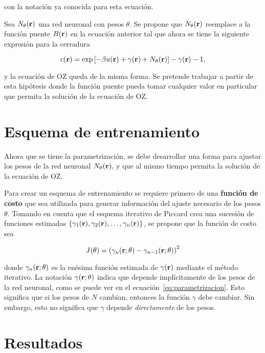 con la notación ya conocida para esta ecuación.

Sea $N_{\theta}(\mathbf{r})$ una red neuronal con pesos $\theta$. Se propone que
$N_{\theta}(\mathbf{r})$ reemplace a la función puente $B(\mathbf{r})$ en la ecuación
anterior tal que ahora se tiene la siguiente expresión para la cerradura

\begin{equation}
    c(\mathbf{r}) = \exp{\left[
            -  \beta u(\mathbf{r})
            +  \gamma(\mathbf{r})
            + N_{\theta}(\mathbf{r})
            \right]} -
    \gamma(\mathbf{r})
    - 1 ,
    \label{eq:parametrizacion}
\end{equation}

y la ecuación de OZ queda de la misma forma.
Se pretende trabajar a partir de esta hipótesis donde la función puente
pueda tomar cualquier valor en particular que permita la solución de la
ecuación de OZ.


\section{Esquema de entrenamiento}

Ahora que se tiene la parametrización, se debe desarrollar una forma para ajustar los
pesos de la red neuronal $N_{\theta}(\mathbf{r}),$ y que al mismo tiempo permita la solución
de la ecuación de OZ.

Para crear un esquema de entrenamiento se requiere primero de una \textbf{función de costo}
que sea utilizada para generar información del ajuste necesario de los pesos $\theta$.
Tomando en cuenta que el esquema iterativo de Piccard crea una sucesión de funciones
estimadas $\{\gamma_1(\mathbf{r}), \gamma_2(\mathbf{r}), \dots, \gamma_n(\mathbf{r})\}$, se propone que la función de costo
sea

\begin{equation}
    J(\theta) = \left(\gamma_{n}(\mathbf{r}; \theta) - \gamma_{n-1}(\mathbf{r}; \theta) \right)^2
    \label{eq:costo}
\end{equation}

donde $\gamma_{n}(\mathbf{r}; \theta)$ es la enésima función estimada de $\gamma(\mathbf{r})$
mediante el método iterativo. La notación $\gamma(\mathbf{r}; \theta)$ indica que depende
implícitamente de los pesos de la red neuronal, como se puede ver en el ecuación~\eqref{eq:parametrizacion}.
Esto significa que si los pesos de $N$ cambian, entonces la función $\gamma$ debe cambiar.
Sin embargo, esto no significa que $\gamma$ depende \emph{directamente} de los pesos.


\section{Resultados}

